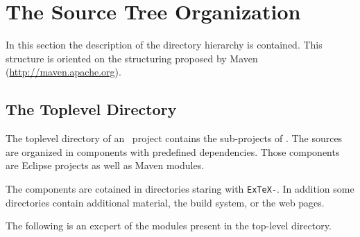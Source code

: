 \chapter{The Source Tree Organization}

In this section the description of the directory hierarchy is
contained. This structure is oriented on the structuring proposed by
Maven (\url{http://maven.apache.org}).


\section{The Toplevel Directory}

The toplevel directory of an \ExTeX\ project contains the sub-projects
of \ExTeX. The sources are organized in components with predefined
dependencies. Those components are Eclipse projects as well as Maven
modules.

The components are cotained in directories staring with
\texttt{ExTeX-}. In addition some directories contain additional
material, the build system, or the web pages.

The following is an excpert of the modules present in the top-level
directory.

